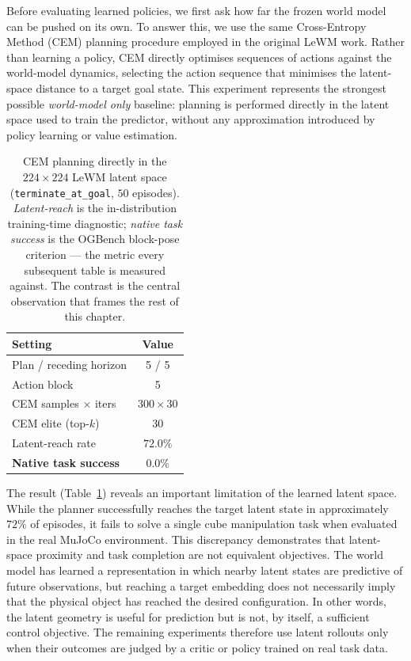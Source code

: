 Before evaluating learned policies, we first ask how far the frozen
world model can be pushed on its own. To answer this, we use the same
Cross-Entropy Method (CEM) \cite{Rubinstein1999} planning procedure employed in the original
LeWM work. Rather than learning a policy, CEM directly
optimises sequences of actions against the world-model dynamics,
selecting the action sequence that minimises the latent-space distance
to a target goal state.
This experiment represents the strongest possible \emph{world-model
only} baseline: planning is performed directly in the latent space used
to train the predictor, without any approximation introduced by policy
learning or value estimation.

\begin{table}[h]
\centering
\caption{CEM planning directly in the $224{\times}224$ LeWM latent
space (\texttt{terminate\_at\_goal}, $50$ episodes).
\emph{Latent-reach} is the in-distribution training-time diagnostic;
\emph{native task success} is the OGBench block-pose criterion --- the
metric every subsequent table is measured against. The contrast is
the central observation that frames the rest of this chapter.}
\label{tab:cem-baseline}
\begin{tabular}{lc}
\toprule
Setting & Value \\
\midrule
Plan / receding horizon      & 5 / 5 \\
Action block                 & 5 \\
CEM samples $\times$ iters   & $300 \times 30$ \\
CEM elite (top-$k$)          & 30 \\
\midrule
Latent-reach rate            & $72.0\%$ \\
\textbf{Native task success} & \textbf{$0.0\%$} \\
\bottomrule
\end{tabular}
\end{table}

The result (Table~\ref{tab:cem-baseline}) reveals an important limitation of the learned latent space.
While the planner successfully reaches the target latent state in
approximately $72\%$ of episodes, it fails to solve a single cube
manipulation task when evaluated in the real MuJoCo environment.
This discrepancy demonstrates that latent-space proximity and task
completion are not equivalent objectives. The world model has learned a
representation in which nearby latent states are predictive of future
observations, but reaching a target embedding does not necessarily imply
that the physical object has reached the desired configuration. In other
words, the latent geometry is useful for prediction but is not, by
itself, a sufficient control objective.
The remaining experiments therefore use latent rollouts only when their
outcomes are judged by a critic or policy trained on real task data.

